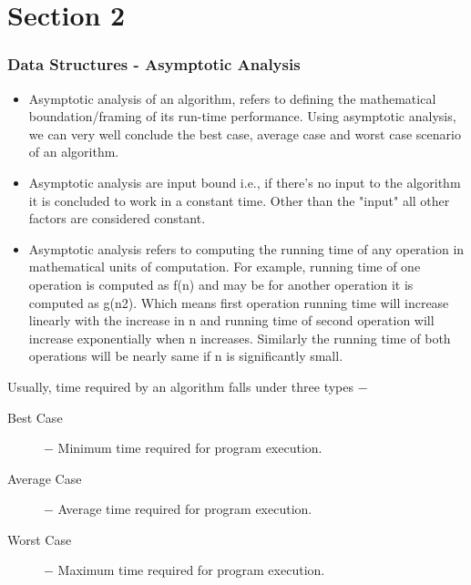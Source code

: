 \documentclass{beamer}
\begin{document}
\section{Section 2}
\begin{frame}
\frametitle{Data Structures - Asymptotic Analysis}
 
 \begin{itemize}
\item Asymptotic analysis of an algorithm, refers to defining the mathematical boundation/framing of its run-time performance. Using asymptotic analysis, we can very well conclude the best case, average case and worst case scenario of an algorithm.
\item 
Asymptotic analysis are input bound i.e., if there's no input to the algorithm it is concluded to work in a constant time. Other than the "input" all other factors are considered constant.
\item 
Asymptotic analysis refers to computing the running time of any operation in mathematical units of computation. For example, running time of one operation is computed as f(n) and may be for another operation it is computed as g(n2). Which means first operation running time will increase linearly with the increase in n and running time of second operation will increase exponentially when n increases. Similarly the running time of both operations will be nearly same if n is significantly small.
\end{itemize}
\end{frame}
\begin{frame}

Usually, time required by an algorithm falls under three types −
\begin{description}
\item[Best Case] − Minimum time required for program execution.

\item[Average Case] − Average time required for program execution.

\item[Worst Case] − Maximum time required for program execution.
\end{description}
\end{frame}
\end{document}
